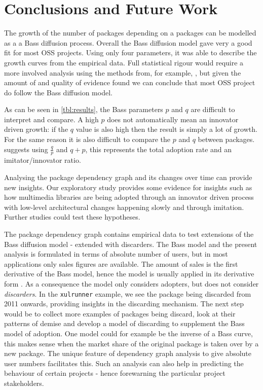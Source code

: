\documentclass[smallextended,final]{svjour3}
\begin{document}
\section{Conclusions and Future Work}

The growth of the number of packages depending on a packages can be modelled as a a Bass diffusion process. Overall the Bass diffusion model gave very a good fit for most OSS projects. Using only four parameters, it was able to describe the growth curves from the empirical data. Full statistical rigour would require a more involved analysis using the methods from, for example, \citet{carlos06}, but given the amount of and quality of evidence found we can conclude that most OSS project do follow the Bass diffusion model.

As can be seen in \ref{tbl:results}, the Bass parameters $p$ and $q$ are difficult to interpret and compare. A high $p$ does not automatically mean an innovator driven growth: if the $q$ value is also high then the result is simply a lot of growth. For the same reason it is also difficult to compare the $p$ and $q$ between packages. \citet{mahajan95} suggests using $\frac{q}{p}$ and $q + p$, this represents the total adoption rate and an imitator/innovator ratio.

Analysing the package dependency graph and its changes over time can provide new insights. Our exploratory study provides some evidence for insights such as how multimedia libraries are being adopted through an innovator driven process with low-level architectural changes happening slowly and through imitation. Further studies could test these hypotheses.

The package dependency graph contains empirical data to test extensions of the Bass diffusion model - extended with discarders. The Bass model and the present analysis is formulated in terms of absolute number of users, but in most applications only sales figures are available. The amount of sales is the first derivative of the Bass model, hence the model is usually applied in its derivative form \citep{mahajan95}. As a consequence the model only considers adopters, but does not consider \emph{discarders}. In the \verb|xulrunner| example, we see the package being discarded from 2011 onwards, providing insights in the discarding mechanism. The next step would be to collect more examples of packages being discard, look at their patterns of demise and develop a model of discarding to supplement the Bass model of adoption. One model could for example be the inverse of a Bass curve, this makes sense when the market share of the original package is taken over by a new package. The unique feature of dependency graph analysis to give absolute user numbers facilitates this. Such an analysis can also help in predicting the behaviour of certain projects - hence forewarning the particular project stakeholders.
\end{document}
